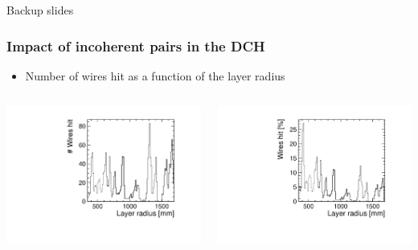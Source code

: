 \documentclass[aspectratio=169, hyperref={colorlinks=true,pdfpagelabels=false,linkcolor=black}, xcolor=dvipsnames,10pt]{beamer}
\begin{document}
\begin{frame}

	\centering
	\Huge{Backup slides}
\end{frame}

\begin{frame}
	\frametitle{Impact of incoherent pairs in the DCH}

	\begin{itemize}
	\item Number of wires hit as a function of the layer radius
	\end{itemize}

	\begin{columns}
	\centering
	\includegraphics[width=\textwidth]{../figures/layerR_vs_wires.pdf}

	\centering
	\includegraphics[width=\textwidth]{../figures/layerR_vs_wires_percent.pdf}	
	
	\end{columns}
	
\end{frame}
\end{document}

